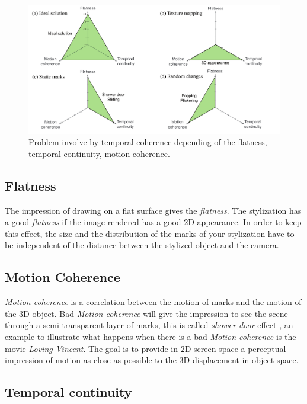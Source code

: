 \begin{figure}[H]
    \begin{center}
    \includegraphics[scale=0.3]{pics/temporal_coherence.png}
    \end{center}
    \caption{Problem involve by temporal coherence depending of the flatness, temporal continuity, motion coherence.}
    \label{problem_temporal_coherence}
\end{figure}

\subsection{Flatness}

The impression of drawing on a flat surface gives the \textit{flatness}. The stylization has a good \textit{flatness} if the image rendered has a good 2D appearance. In order to keep this effect, the size and the distribution of the marks of your stylization have to be independent of the distance between the stylized object and the camera.

\subsection{Motion Coherence}

\textit{Motion coherence} is a correlation between the motion of marks and the motion of the 3D object. Bad \textit{Motion coherence} will give the impression to see the scene through a semi-transparent layer of marks, this is called \textit{shower door} effect \cite{meier_painterly_1996}, an example to illustrate what happens when there is a bad \textit{Motion coherence} is the movie \textit{Loving Vincent}\cite{LovingVincent}. The goal is to provide in 2D screen space a perceptual impression of motion as
close as possible to the 3D displacement in object space.

\subsection{Temporal continuity}

